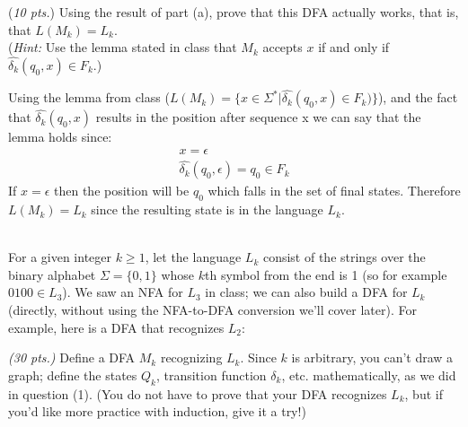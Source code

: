 \documentclass[11pt]{article}
\begin{document}
\begin{qunlist}
\begin{qparts}
    \item (\emph{10 pts.})
    Using the result of part (a), prove that this DFA actually works, that is, that $L(M_k) = L_k$.\\
    (\emph{Hint:} Use the lemma stated in class that $M_k$ accepts $x$ if and only if $\widehat{\delta_k}(q_0, x) \in F_k$.)
    \begin{solution}
      Using the lemma from class ($L(M_k) = \{x \in \Sigma^* | \widehat{\delta_k}(q_0,x) \in F_k)\}$), and the fact that $\widehat{\delta_k}(q_0,x)$ results in the position after sequence x we can say that the lemma holds since:
      \begin{gather}
        x = \epsilon\\
        \widehat{\delta_k}(q_0,\epsilon) = q_0 \in F_k
      \end{gather}
      If $x = \epsilon$ then the position will be $q_0$ which falls in the set of final states. Therefore $L(M_k) = L_k$ since the resulting state is in the language $L_k$.
    \end{solution}
  \end{qparts}

  \newpage

  \\
  For a given integer $k \ge 1$, let the language $L_k$ consist of the strings over the binary alphabet $\Sigma = \{0,1\}$ whose $k$th symbol from the end is 1 (so for example $0100 \in L_3$).
  We saw an NFA for $L_3$ in class; we can also build a DFA for $L_k$ (directly, without using the NFA-to-DFA conversion we'll cover later).
  For example, here is a DFA that recognizes $L_2$:


  \begin{qparts}
    \item \emph{(30 pts.)}
    Define a DFA $M_k$ recognizing $L_k$.
    Since $k$ is arbitrary, you can't draw a graph; define the states $Q_k$, transition function $\delta_k$, etc. mathematically, as we did in question (1).
    (You do not have to prove that your DFA recognizes $L_k$, but if you'd like more practice with induction, give it a try!)


\end{qparts}
\end{qunlist}
\end{document}

